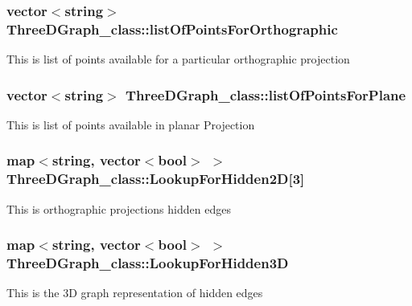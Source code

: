 \subsubsection[{\texorpdfstring{list\+Of\+Points\+For\+Orthographic}{listOfPointsForOrthographic}}]{\setlength{\rightskip}{0pt plus 5cm}vector$<$string$>$ Three\+D\+Graph\+\_\+class\+::list\+Of\+Points\+For\+Orthographic}\hypertarget{classThreeDGraph__class_a9b5605ee14d7774be307a78d00930bd2}{}\label{classThreeDGraph__class_a9b5605ee14d7774be307a78d00930bd2}
This is list of points available for a particular orthographic projection 
\subsubsection[{\texorpdfstring{list\+Of\+Points\+For\+Plane}{listOfPointsForPlane}}]{\setlength{\rightskip}{0pt plus 5cm}vector$<$string$>$ Three\+D\+Graph\+\_\+class\+::list\+Of\+Points\+For\+Plane}\hypertarget{classThreeDGraph__class_a7a63687d665e48d41867a293d5d8bc16}{}\label{classThreeDGraph__class_a7a63687d665e48d41867a293d5d8bc16}
This is list of points available in planar Projection 
\subsubsection[{\texorpdfstring{Lookup\+For\+Hidden2D}{LookupForHidden2D}}]{\setlength{\rightskip}{0pt plus 5cm}map$<$string, vector$<$bool$>$ $>$ Three\+D\+Graph\+\_\+class\+::\+Lookup\+For\+Hidden2D\mbox{[}3\mbox{]}}\hypertarget{classThreeDGraph__class_a8b4c56978bacc0a509d5d69bf79c7125}{}\label{classThreeDGraph__class_a8b4c56978bacc0a509d5d69bf79c7125}
This is orthographic projections hidden edges 
\subsubsection[{\texorpdfstring{Lookup\+For\+Hidden3D}{LookupForHidden3D}}]{\setlength{\rightskip}{0pt plus 5cm}map$<$string, vector$<$bool$>$ $>$ Three\+D\+Graph\+\_\+class\+::\+Lookup\+For\+Hidden3D}\hypertarget{classThreeDGraph__class_ac32d99fa519519003b2e4658922afbe0}{}\label{classThreeDGraph__class_ac32d99fa519519003b2e4658922afbe0}
This is the 3D graph representation of hidden edges 
